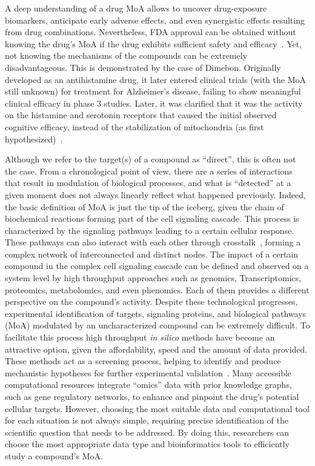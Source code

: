 A deep understanding of a drug \gls{MoA} allows to uncover drug-exposure biomarkers, anticipate early adverse effects, and even synergistic effects resulting from drug combinations. 
Nevertheless, FDA approval can be obtained without knowing the drug's \gls{MoA} if the drug exhibits sufficient safety and efficacy~\cite{RN38, RN68}. 
Yet, not knowing the mechanisms of the compounds can be extremely disadvantageous. This is demonstrated by the case of Dimebon. 
Originally developed as an antihistamine drug, it later entered clinical trials (with the \gls{MoA} still unknown) for treatment for Alzheimer's disease, failing to show meaningful clinical efficacy in phase 3 studies. 
Later, it was clarified that it was the activity on the histamine and serotonin receptors that caused the initial observed cognitive efficacy, instead of the stabilization of mitochondria (as first hypothesized)~\cite{RN38, RN69}.

Although we refer to the target(s) of a compound as “direct”, this is often not the case. 
From a chronological point of view, there are a series of interactions that result in modulation of biological processes, and what is “detected” at a given moment does not always linearly reflect what happened previously. 
Indeed, the basic definition of MoA is just the tip of the iceberg, given the chain of biochemical reactions forming part of the cell signaling cascade. 
This process is characterized by the signaling pathways leading to a certain cellular response. These pathways can also interact with each other through crosstalk~\cite{RN94}, forming a complex network of interconnected and distinct nodes. 
The impact of a certain compound in the complex cell signaling cascade can be defined and observed on a system level by high throughput approaches such as genomics, \gls{Transcriptomics}, proteomics, metabolomics, and even phenomics. 
Each of them provides a different perspective on the compound's activity. 
Despite these technological progresses, experimental identification of targets, signaling proteins, and biological pathways (\gls{MoA}) modulated by an uncharacterized compound can be extremely difficult. 
To facilitate this process high throughput \textit{in silico} methods have become an attractive option, given the affordability, speed and the amount of data provided. 
These methods act as a screening process, helping to identify and produce mechanistic hypotheses for further experimental validation~\cite{RN38}. 
Many accessible computational resources integrate “omics” data with prior knowledge graphs, such as gene regulatory networks, to enhance and pinpoint the drug's potential cellular targets. 
However, choosing the most suitable data and computational tool for each situation is not always simple, requiring precise identification of the scientific question that needs to be addressed. 
By doing this, researchers can choose the most appropriate data type and bioinformatics tools to efficiently study a compound's MoA.

